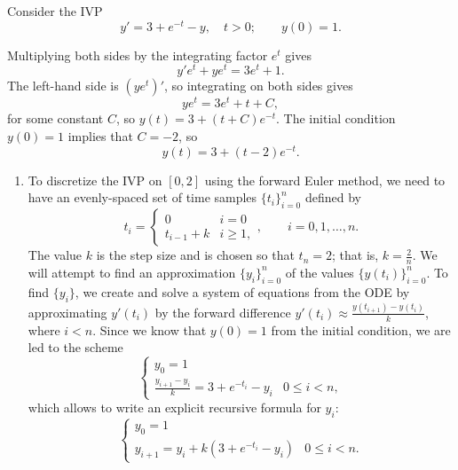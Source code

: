 \documentclass{homework}
\begin{document}
	\maketitle
	
	\question 
	
	Consider the IVP
	\begin{equation}
		y' = 3 + e^{-t} - y, \quad t > 0; \qquad y(0) = 1.
	\end{equation}
	
	\begin{arabicparts}
		\questionpart Multiplying both sides by the integrating factor $e^t$ gives
		\begin{equation}
			y'e^t + ye^t = 3e^t + 1.
		\end{equation}
		The left-hand side is $(ye^t)'$, so integrating on both sides gives
		\begin{equation}
			ye^t = 3e^t + t + C,
		\end{equation}
		for some constant $C$, so $y(t) = 3 + (t + C)e^{-t}$. The initial condition $y(0) = 1$ implies that $C = -2$, so
		\begin{equation}
			y(t) = 3 + (t-2)e^{-t}.
		\end{equation}
		
		\questionpart
		\begin{enumerate}[label=({\bf\alph*})]
			\item To discretize the IVP on $[0,2]$ using the forward Euler method, we need to have an evenly-spaced set of time samples $\{t_i\}_{i=0}^n$ defined by
			\begin{equation}
				t_i = \begin{cases}
					0 & i = 0 \\
					t_{i-1} + k & i \ge 1,
				\end{cases}, \qquad i = 0,1,\dots,n.
			\end{equation}
			The value $k$ is the step size and is chosen so that $t_n = 2$; that is, $k = \frac{2}{n}$. We will attempt to find an approximation $\{y_i\}_{i=0}^n$ of the values $\{y(t_i)\}_{i=0}^n$. To find $\{y_i\}$, we create and solve a system of equations from the ODE by approximating $y'(t_i)$ by the forward difference $y'(t_i) \approx \frac{y(t_{i+1}) - y(t_i)}{k}$, where $i < n$. Since we know that $y(0) = 1$ from the initial condition, we are led to the scheme
			\begin{equation}
				\begin{cases}
					y_0 = 1 &\\
					\frac{y_{i+1} - y_i}{k} = 3 + e^{-t_i} - y_i & 0\le i < n,
				\end{cases}
			\end{equation}
			which allows to write an explicit recursive formula for $y_i$:
			\begin{equation}
				\begin{cases}
					y_0 = 1 &\\
					y_{i+1} = y_i + k(3 + e^{-t_i} - y_i) & 0\le i < n.
				\end{cases}
			\end{equation}
			

\end{enumerate}
\end{arabicparts}
\end{document}
